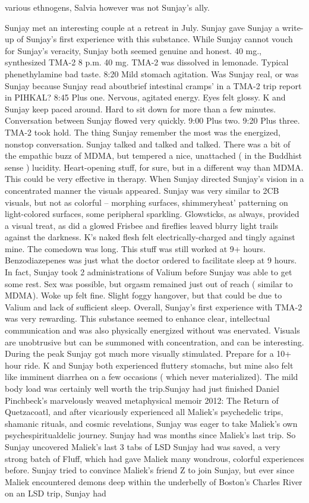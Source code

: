 \documentclass[12pt]{book}
\begin{document}
various ethnogens, Salvia however was not Sunjay's ally.



Sunjay met an interesting couple at a retreat in July. Sunjay gave Sunjay a write-up of Sunjay's first experience with this substance. While Sunjay cannot vouch for Sunjay's veracity, Sunjay both seemed genuine and honest. 40 mg., synthesized TMA-2 8 p.m. 40 mg. TMA-2 was dissolved in lemonade. Typical phenethylamine bad taste. 8:20 Mild stomach agitation. Was Sunjay real, or was Sunjay because Sunjay read aboutbrief intestinal cramps' in a TMA-2 trip report in PIHKAL? 8:45 Plus one. Nervous, agitated energy. Eyes felt glossy. K and Sunjay keep paced around. Hard to sit down for more than a few minutes. Conversation between Sunjay flowed very quickly. 9:00 Plus two. 9:20 Plus three. TMA-2 took hold. The thing Sunjay remember the most was the energized, nonstop conversation. Sunjay talked and talked and talked. There was a bit of the empathic buzz of MDMA, but tempered a nice, unattached ( in the Buddhist sense ) lucidity. Heart-opening stuff, for sure, but in a different way than MDMA. This could be very effective in therapy. When Sunjay directed Sunjay's vision in a concentrated manner the visuals appeared. Sunjay was very similar to 2CB visuals, but not as colorful -- morphing surfaces, shimmeryheat' patterning on light-colored surfaces, some peripheral sparkling. Glowsticks, as always, provided a visual treat, as did a glowed Frisbee and fireflies leaved blurry light trails against the darkness. K's naked flesh felt electrically-charged and tingly against mine. The comedown was long. This stuff was still worked at 9+ hours. Benzodiazepenes was just what the doctor ordered to facilitate sleep at 9 hours. In fact, Sunjay took 2 administrations of Valium before Sunjay was able to get some rest. Sex was possible, but orgasm remained just out of reach ( similar to MDMA). Woke up felt fine. Slight foggy hangover, but that could be due to Valium and lack of sufficient sleep. Overall, Sunjay's first experience with TMA-2 was very rewarding. This substance seemed to enhance clear, intellectual communication and was also physically energized without was enervated. Visuals are unobtrusive but can be summoned with concentration, and can be interesting. During the peak Sunjay got much more visually stimulated. Prepare for a 10+ hour ride. K and Sunjay both experienced fluttery stomachs, but mine also felt like imminent diarrhea on a few occasions ( which never materialized). The mild body load was certainly well worth the trip.Sunjay had just finished Daniel Pinchbeck's marvelously weaved metaphysical memoir 2012: The Return of Quetzacoatl, and after vicariously experienced all Maliek's psychedelic trips, shamanic rituals, and cosmic revelations, Sunjay was eager to take Maliek's own psychespiritualdelic journey. Sunjay had was months since Maliek's last trip. So Sunjay uncovered Maliek's last 3 tabs of LSD Sunjay had was saved, a very strong batch of Fluff, which had gave Maliek many wondrous, colorful experiences before. Sunjay tried to convince Maliek's friend Z to join Sunjay, but ever since Maliek encountered demons deep within the underbelly of Boston's Charles River on an LSD trip, Sunjay had 
\end{document}
